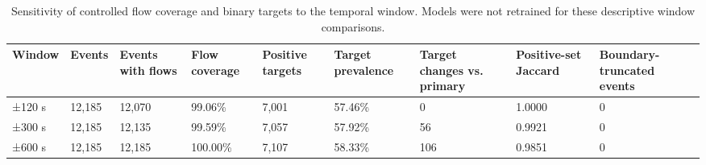 \begin{table}
\caption{Sensitivity of controlled flow coverage and binary targets to the temporal window. Models were not retrained for these descriptive window comparisons.}
\label{tab:alignment-window-sensitivity}
\begin{tabular}{lllllllll}
\toprule
Window & Events & Events with flows & Flow coverage & Positive targets & Target prevalence & Target changes vs. primary & Positive-set Jaccard & Boundary-truncated events \\
\midrule
±120 s & 12,185 & 12,070 & 99.06\% & 7,001 & 57.46\% & 0 & 1.0000 & 0 \\
±300 s & 12,185 & 12,135 & 99.59\% & 7,057 & 57.92\% & 56 & 0.9921 & 0 \\
±600 s & 12,185 & 12,185 & 100.00\% & 7,107 & 58.33\% & 106 & 0.9851 & 0 \\
\bottomrule
\end{tabular}
\end{table}
